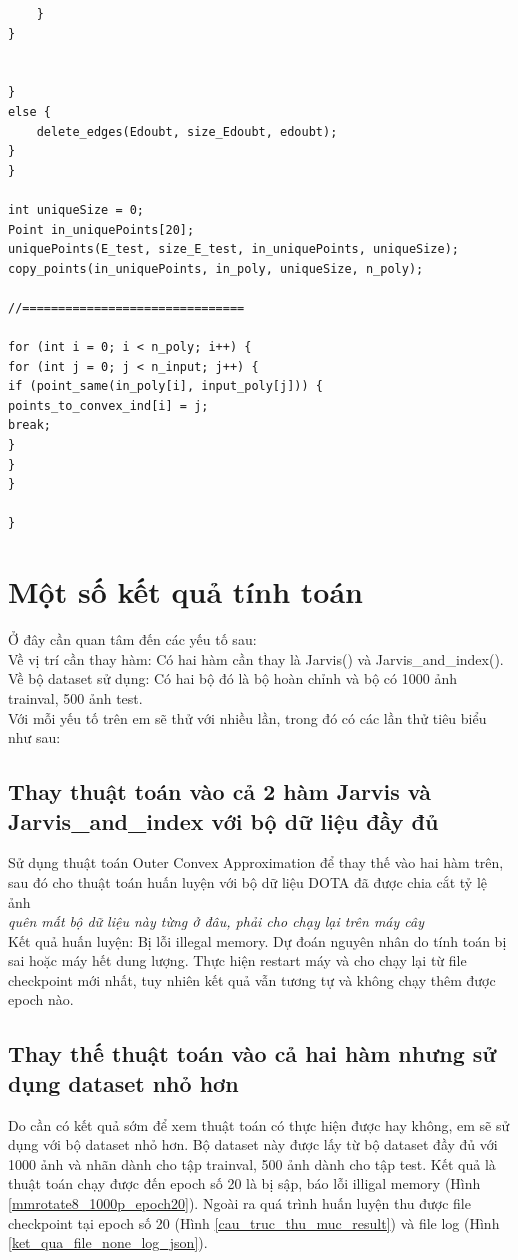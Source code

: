 \documentclass[12pt,a4paper,openany,oneside]{report}
\begin{document}
\begin{lstlisting}
	}
}


}
else {
	delete_edges(Edoubt, size_Edoubt, edoubt);
}
}

int uniqueSize = 0;
Point in_uniquePoints[20];
uniquePoints(E_test, size_E_test, in_uniquePoints, uniqueSize);
copy_points(in_uniquePoints, in_poly, uniqueSize, n_poly);

//===============================

for (int i = 0; i < n_poly; i++) {
for (int j = 0; j < n_input; j++) {
if (point_same(in_poly[i], input_poly[j])) {
points_to_convex_ind[i] = j;
break;
}
}
}                                          

}
\end{lstlisting}	
\chapter{Một số kết quả tính toán }

Ở đây cần quan tâm đến các yếu tố sau:\\
Về vị trí cần thay hàm: Có hai hàm cần thay là Jarvis() và Jarvis\_and\_index().\\
Về bộ dataset sử dụng: Có hai bộ đó là bộ hoàn chỉnh và bộ có 1000 ảnh trainval, 500 ảnh test.\\
Với mỗi yếu tố trên em sẽ thử với nhiều lần, trong đó có các lần thử tiêu biểu như sau:
\section{Thay thuật toán vào cả 2 hàm Jarvis và\\
	 Jarvis\_and\_index với bộ dữ liệu đầy đủ}
Sử dụng thuật toán Outer Convex Approximation để thay thế vào hai hàm trên, sau đó cho thuật toán huấn luyện với bộ dữ liệu DOTA đã được chia cắt tỷ lệ ảnh\\
\textit{quên mất bộ dữ liệu này từng ở đâu, phải cho chạy lại trên máy cây}\\
Kết quả huấn luyện: Bị lỗi illegal memory. Dự đoán nguyên nhân do tính toán bị sai hoặc máy hết dung lượng. Thực hiện restart máy và cho chạy lại từ file checkpoint mới nhất, tuy nhiên kết quả vẫn tương tự và không chạy thêm được epoch nào.
\section{Thay thế thuật toán vào cả hai hàm nhưng sử dụng dataset nhỏ hơn}
Do cần có kết quả sớm để xem thuật toán có thực hiện được hay không, em sẽ sử dụng với bộ dataset nhỏ hơn. Bộ dataset này được lấy từ bộ dataset đầy đủ với 1000 ảnh và nhãn dành cho tập trainval, 500 ảnh dành cho tập test. Kết quả là thuật toán chạy được đến epoch số 20 là bị sập, báo lỗi illigal memory (Hình \ref{mmrotate8_1000p_epoch20}). Ngoài ra quá trình huấn luyện thu được file checkpoint tại epoch số 20 (Hình \ref{cau_truc_thu_muc_result}) và file log (Hình \ref{ket_qua_file_none_log_json}).
\end{document}
